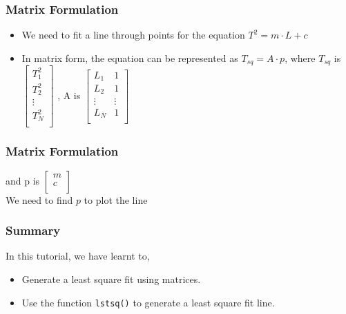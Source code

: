 \documentclass[17pt]{beamer}
\begin{document}
\begin{frame}[fragile]
  \frametitle{Matrix Formulation}
  \begin{itemize}
  \item We need to fit a line through points for the equation $T^2 = m \cdot L+c$
  \item In matrix form, the equation can be represented as $T_{sq} = A \cdot p$, where $T_{sq}$ is
    $\begin{bmatrix}
    T^2_1 \\
    T^2_2 \\
    \vdots\\
    T^2_N \\
  \end{bmatrix}$
    , A is   
    $\begin{bmatrix}
    L_1 & 1 \\
    L_2 & 1 \\
    \vdots & \vdots\\
    L_N & 1 \\
  \end{bmatrix}$
\end{itemize}
\end{frame}

\begin{frame}[fragile]
  \frametitle{Matrix Formulation}
  
    and p is 
    $\begin{bmatrix}
      m\\
      c\\
    \end{bmatrix}$
   \\  We need to find $p$ to plot the line
\end{frame}

\begin{frame}
\frametitle{Summary}
\label{sec-5}
In this tutorial, we have learnt to,
\begin{itemize}
\item Generate a least square fit using matrices. \pause
\item Use the function \texttt{lstsq()} to generate a least square fit line.
\end{itemize}
\end{frame}

\end{document}
